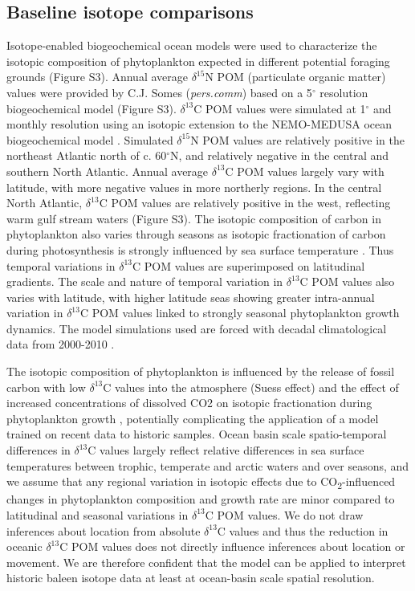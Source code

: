 \documentclass[a4paper,12pt]{article}
\begin{document}
\subsection{Baseline isotope comparisons}
\label{baseline-isotope-comparisons}

Isotope-enabled biogeochemical ocean models \citep{magozzi2017using,schmittner2016complementary} were used to characterize the isotopic composition of phytoplankton expected in different potential foraging grounds (Figure S3). 
Annual average \(\delta^{15}\)N POM (particulate organic matter) values were provided by C.J. Somes (\textit{pers.comm}) based on a 5\({}^{\circ}\) resolution biogeochemical model (Figure S3). 
\(\delta^{13}\)C POM values were simulated at 1\({}^{\circ}\) and monthly resolution using an isotopic extension to the NEMO-MEDUSA ocean biogeochemical model \citep{magozzi2017using,yool2013medusa}. 
Simulated \(\delta^{15}\)N POM values are relatively positive in the northeast Atlantic north of c. 60\({}^{\circ}\)N, and relatively negative in the central and southern North Atlantic. 
Annual average \(\delta^{13}\)C POM values largely vary with latitude, with more negative values in more northerly regions. 
In the central North Atlantic, \(\delta^{13}\)C POM values are relatively positive in the west, reflecting warm gulf stream waters (Figure S3). 
The isotopic composition of carbon in phytoplankton also varies through seasons as isotopic fractionation of carbon during photosynthesis is strongly influenced by sea surface temperature \citep{magozzi2017using,laws1995dependence}. 
Thus temporal variations in \(\delta^{13}\)C POM values are superimposed on latitudinal gradients. 
The scale and nature of temporal variation in \(\delta^{13}\)C POM values also varies with latitude, with higher latitude seas showing greater intra-annual variation in \(\delta^{13}\)C POM values linked to strongly seasonal phytoplankton growth dynamics.
The model simulations used are forced with decadal climatological data from 2000-2010 \citep{magozzi2017using}. 

The isotopic composition of phytoplankton is influenced by the release of fossil carbon with low \(\delta^{13}\)C values into the atmosphere (Suess effect) and the effect of increased concentrations of dissolved CO2 on isotopic fractionation during phytoplankton growth 
, potentially complicating the application of a model trained on recent data to historic samples. 
Ocean basin scale spatio-temporal differences in \(\delta^{13}\)C values largely reflect relative differences in sea surface temperatures between trophic, temperate and arctic waters and over seasons, and we assume that any regional variation in isotopic effects due to CO\textsubscript{2}-influenced changes in phytoplankton composition and growth rate are minor compared to latitudinal and seasonal variations in \(\delta^{13}\)C POM values. 
We do not draw inferences about location from absolute \(\delta^{13}\)C values and thus the reduction in oceanic \(\delta^{13}\)C POM values does not directly influence inferences about location or movement.  
We are therefore confident that the \cite{magozzi2017using} model can be applied to interpret historic baleen isotope data at least at ocean-basin scale spatial resolution.
\end{document}
